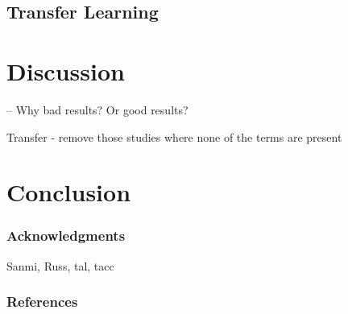 \documentclass{article} %
\begin{document}
 \subsection{Transfer Learning}


\section{Discussion}
-- Why bad results? Or good results?

Transfer - remove those studies where none of the terms are present

\section{Conclusion}

\subsubsection*{Acknowledgments}
Sanmi, Russ, tal, tacc

\subsubsection*{References}

\nocite{*}

\end{document}
